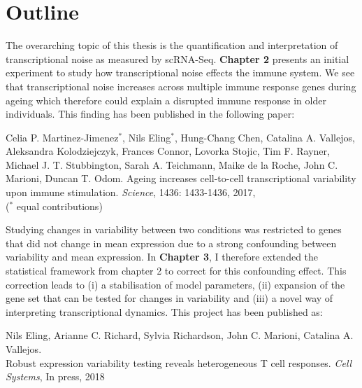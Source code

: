 

\section{Outline}

The overarching topic of this thesis is the quantification and interpretation of transcriptional noise as measured by scRNA-Seq. 
\textbf{Chapter 2} presents an initial experiment to study how  transcriptional noise effects the immune system. 
We see that transcriptional noise increases across multiple immune response genes during ageing which therefore could explain a disrupted immune response in older individuals. 
This finding has been published in the following paper:

\begin{Abstract}
\hspace{-5mm} Celia P. Martinez-Jimenez$^\ast$, Nils  Eling$^\ast$, Hung-Chang Chen, Catalina A. Vallejos, Aleksandra Kolodziejczyk, Frances Connor, Lovorka Stojic, Tim F. Rayner, Michael J. T. Stubbington, Sarah A. Teichmann, Maike de la Roche, John C. Marioni, Duncan T. Odom. 
Ageing increases cell-to-cell transcriptional variability upon immune stimulation. \emph{Science}, 1436: 1433-1436, 2017, \\
($^\ast$ equal contributions) 
\end{Abstract}

Studying changes in variability between two conditions was restricted to genes that did not change in mean expression due to a strong confounding between variability and mean expression. 
In \textbf{Chapter 3}, I therefore extended the statistical framework from chapter 2 to correct for this confounding effect. 
This correction leads to (i) a stabilisation of model parameters, (ii) expansion of the gene set that can be tested for changes in variability and (iii) a novel way of interpreting transcriptional dynamics. 
This project has been published as:

\begin{Abstract}
\hspace{-5mm} Nils Eling, Arianne C. Richard, Sylvia Richardson, John C. Marioni, Catalina A. Vallejos. \\
Robust expression variability testing reveals heterogeneous T cell responses. \emph{Cell Systems}, In press, 2018
\end{Abstract}

